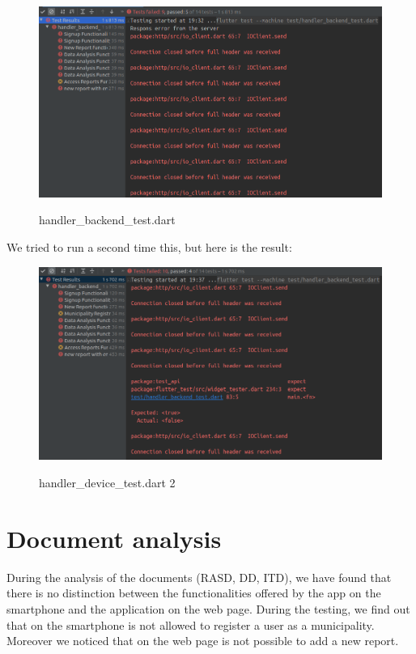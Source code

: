 \documentclass[../ATD.tex]{subfiles}
\begin{document}
    \begin{figure}[H]
        \centering
        \includegraphics[scale = 0.5]{assets/t7.png}\\
        \caption[handler\_device\_test.dart]{handler\_backend\_test.dart}
    \end{figure}
    We tried to run a second time this, but here is the result:
    \begin{figure}[H]
        \centering
        \includegraphics[scale = 0.5]{assets/t7v2.png}\\
        \caption[handler\_device\_test.dart 2]{handler\_device\_test.dart 2}
    \end{figure}


    \section{Document analysis}\label{sec:document-analysis}
    During the analysis of the documents (RASD, DD, ITD), we have found that there is no distinction between the functionalities offered by the app on the smartphone and the application on the web page.
    During the testing, we find out that on the smartphone is not allowed to register a user as a municipality.
    Moreover we noticed that on the web page is not possible to add a new report.
\end{document}
